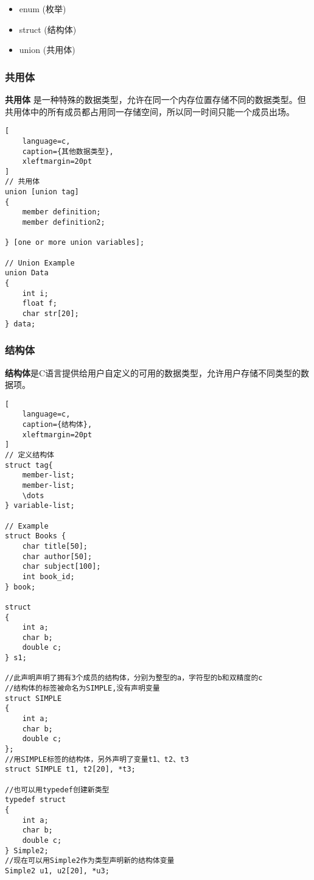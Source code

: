 \begin{itemize}
	\item enum (枚举)
	\item struct (结构体)
	\item union (共用体)

\end{itemize}

\subsubsection{共用体}
\textbf{共用体} 是一种特殊的数据类型，允许在同一个内存位置存储不同的数据类型。但共用体中的所有成员都占用同一存储空间，所以同一时间只能一个成员出场。


\begin{lstlisting}[
	language=c,
	caption={其他数据类型},
	xleftmargin=20pt
]
// 共用体
union [union tag]
{
	member definition;
	member definition2;

} [one or more union variables];

// Union Example
union Data
{
	int i;
	float f;
	char str[20];
} data;

\end{lstlisting}

\subsubsection{结构体}
\textbf{结构体}是C语言提供给用户自定义的可用的数据类型，允许用户存储不同类型的数据项。

\begin{lstlisting}[
	language=c,
	caption={结构体},
	xleftmargin=20pt
]
// 定义结构体
struct tag{
	member-list;
	member-list;
	\dots
} variable-list;

// Example 
struct Books {
	char title[50];
	char author[50];
	char subject[100];
	int book_id;
} book;

struct
{
    int a;
    char b;
    double c;
} s1;

//此声明声明了拥有3个成员的结构体，分别为整型的a，字符型的b和双精度的c
//结构体的标签被命名为SIMPLE,没有声明变量
struct SIMPLE
{
    int a;
    char b;
    double c;
};
//用SIMPLE标签的结构体，另外声明了变量t1、t2、t3
struct SIMPLE t1, t2[20], *t3;

//也可以用typedef创建新类型
typedef struct
{
    int a;
    char b;
    double c;
} Simple2;
//现在可以用Simple2作为类型声明新的结构体变量
Simple2 u1, u2[20], *u3;

\end{lstlisting}


